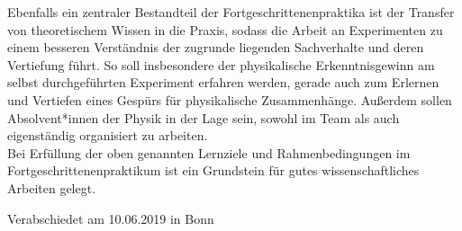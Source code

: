 ﻿\documentclass[DIV=calc]{scrartcl}
\begin{document}
Ebenfalls ein zentraler Bestandteil der Fortgeschrittenenpraktika ist der Transfer von theoretischem Wissen in die Praxis, sodass die Arbeit an Experimenten zu einem besseren Verständnis der zugrunde liegenden Sachverhalte und deren Vertiefung führt. So soll insbesondere der physikalische Erkenntnisgewinn am selbst durchgeführten Experiment erfahren werden, gerade auch zum Erlernen und Vertiefen eines Gespürs für physikalische Zusammenhänge. Außerdem sollen Absolvent*innen der Physik in der Lage sein, sowohl im Team als auch eigenständig organisiert zu arbeiten.\\[-0.25cm]

Bei Erfüllung der oben genannten Lernziele und Rahmenbedingungen im Fortgeschrittenenpraktikum ist ein Grundstein für gutes wissenschaftliches Arbeiten gelegt.\\[-0.7cm]
    \begin{flushright}
        Verabschiedet am 10.06.2019 in Bonn
    \end{flushright}
\end{document}
